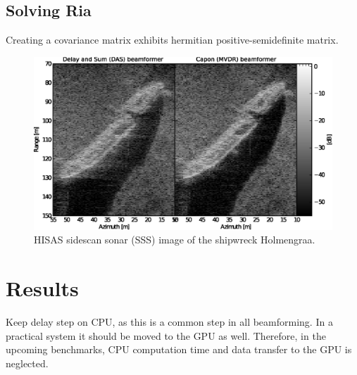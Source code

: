 \documentclass[12pt,journal,captionsoff,onecolumn]{IEEEtran}
\let\MYoriglatexcaption\caption               %
\renewcommand{\caption}[2][\relax]{\MYoriglatexcaption[#2]{#2}}
\newcommand\1{\vec 1}
\begin{document}

\cite{Owens2007} \cite{Lee2010}


\subsection{Solving Ria}

Creating a covariance matrix exhibits hermitian positive-semidefinite matrix.


\begin{figure}[!t]
\centering
\includegraphics[width=\linewidth]{gfx/img_holmengraa.ps}
\caption{HISAS sidescan sonar (SSS) image of the shipwreck Holmengraa.}\label{holmengraa}
\end{figure}


\section{Results}

Keep delay step on CPU, as this is a common step in all beamforming. In a practical system it should be moved to the GPU as well. Therefore, in the upcoming benchmarks, CPU computation time and data transfer to the GPU is neglected.
\end{document}
